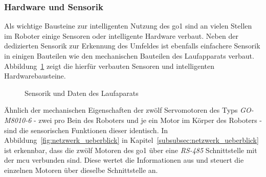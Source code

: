 \subsubsection{Hardware und Sensorik}
\label{subsubsec:hardware_sensorik}

Als wichtige Bausteine zur intelligenten Nutzung des \gls{go1} sind an vielen Stellen im Roboter
einige Sensoren oder intelligente Hardware verbaut.
Neben der dedizierten Sensorik zur Erkennung des Umfeldes ist ebenfalls einfachere Sensorik
in einigen Bauteilen wie den mechanischen Bauteilen des Laufapparats verbaut.
Abbildung~\ref{fig:laufapparat} zeigt die hierfür verbauten Sensoren und intelligenten Hardwarebausteine.

\begin{figure}[h]
    \caption{Sensorik und Daten des Laufaparats}\label{fig:laufapparat}
\end{figure}

Ähnlich der mechanischen Eigenschaften der zwölf Servomotoren des Typs \emph{GO-M8010-6} - zwei pro Bein des Roboters 
und je ein Motor im Körper des Roboters  - sind die sensorischen Funktionen dieser identisch.
In Abbildung~\ref{fig:netzwerk_ueberblick} in Kapitel~\ref{subsubsec:netzwerk_ueberblick} ist erkennbar, dass die
zwölf Motoren des \gls{go1} über eine \emph{RS-485} Schnittstelle mit der \gls{mcu} verbunden sind.
Diese wertet die Informationen aus und steuert die einzelnen Motoren über dieselbe Schnittstelle an.

